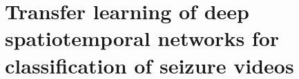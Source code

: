 \chapter[Transfer learning for classification of seizure videos]{Transfer learning of deep spatiotemporal networks for classification of seizure videos}

\doublespacing
\onehalfspacing
